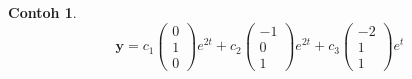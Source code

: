 \documentclass[a4paper]{article}
\theoremstyle{definisi}
\newtheorem{contoh}{Contoh}[section]
\numberwithin{equation}{section}
\begin{document}
\begin{contoh}
    \begin{equation*}
      \mathbf{y}=c_1\begin{pmatrix}
        0\\1\\0
      \end{pmatrix}e^{2t}+c_2\begin{pmatrix}
        -1\\0\\1
      \end{pmatrix}e^{2t}+c_3\begin{pmatrix}
        -2\\1\\1
      \end{pmatrix}e^{t}
    \end{equation*}
  \end{contoh}
\end{document}

